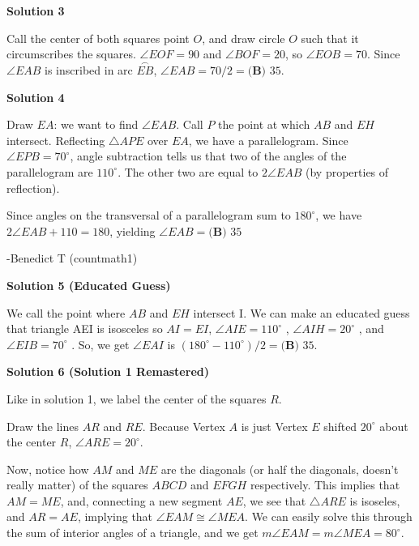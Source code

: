 \begin{enumerate}
\textbf{Solution 3}

Call the center of both squares point $O$, and draw circle $O$ such that it circumscribes the squares. $\angle{EOF} = 90$ and $\angle{BOF} = 20$, so $\angle{EOB} = 70$. Since $\angle{EAB}$ is inscribed in arc $\overset \frown {EB}$, $\angle{EAB} = 70/2 = \boxed{\textbf{(B) }35}$.

 



\textbf{Solution 4}

Draw $EA$: we want to find $\angle EAB$. Call $P$ the point at which $AB$ and $EH$ intersect. Reflecting $\triangle APE$ over $EA$, we have a parallelogram. Since $\angle EPB = 70^{\circ}$, angle subtraction tells us that two of the angles of the parallelogram are $110^{\circ}$. The other two are equal to $2\angle EAB$ (by properties of reflection). 

 Since angles on the transversal of a parallelogram sum to $180^{\circ}$, we have $2\angle EAB + 110 = 180$, yielding $\angle EAB = \boxed{\textbf{(B) }35}$

 -Benedict T (countmath1)

 



\textbf{Solution 5 (Educated Guess)}

We call the point where $AB$ and $EH$ intersect I. We can make an educated guess that triangle AEI is isosceles so $AI=EI$, $\angle AIE = 110^{\circ}$ , $\angle AIH = 20^{\circ}$ , and $\angle EIB = 70^{\circ}$ . So, we get $\angle EAI$ is $(180^{\circ} - 110^{\circ})/2  = \boxed{\textbf{(B) }35}$.

 



\textbf{Solution 6 (Solution 1 Remastered)}

Like in solution 1, we label the center of the squares \( R \).

 Draw the lines \( AR \) and \( RE \). Because Vertex \( A \) is just Vertex \( E \) shifted \( 20^\circ \) about the center \( R \), \( \angle ARE = 20^\circ \).

 Now, notice how \( AM \) and \( ME \) are the diagonals (or half the diagonals, doesn't really matter) of the squares \( ABCD \) and \( EFGH \) respectively. This implies that \( AM = ME \), and, connecting a new segment \( AE \), we see that \( \triangle ARE \) is isoseles, and \( AR = AE \), implying that \( \angle EAM \cong \angle MEA \). We can easily solve this through the sum of interior angles of a triangle, and we get \( m \angle EAM = m \angle MEA = 80^\circ \).


\end{enumerate}
